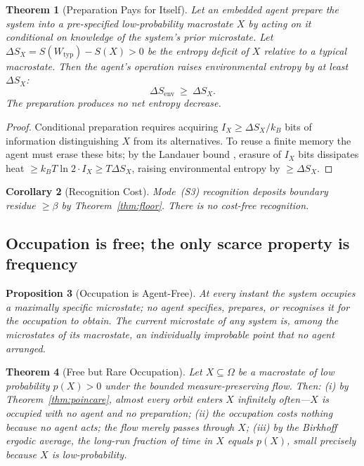 \documentclass[twocolumn,10pt,a4paper]{article}
\theoremstyle{thmstyle}
\newtheorem{theorem}{Theorem}[section]
\newtheorem{proposition}[theorem]{Proposition}
\newtheorem{corollary}[theorem]{Corollary}
\theoremstyle{definition}
\theoremstyle{remark}
\begin{document}
\begin{theorem}[Preparation Pays for Itself]
\label{thm:landauer}
Let an embedded agent prepare the system into a pre-specified
low-probability macrostate $X$ by acting on it conditional on
knowledge of the system's prior microstate. Let
$\Delta S_{X}=S(W_{\mathrm{typ}})-S(X)>0$ be the entropy deficit of
$X$ relative to a typical macrostate. Then the agent's operation
raises environmental entropy by at least $\Delta S_{X}$:
\[
\Delta S_{\mathrm{env}}\ \geq\ \Delta S_{X}.
\]
The preparation produces no net entropy decrease.
\end{theorem}

\begin{proof}
Conditional preparation requires acquiring $I_{X}\geq\Delta S_{X}/k_{B}$
bits of information distinguishing $X$ from its alternatives. To
reuse a finite memory the agent must erase these bits; by the
Landauer bound \citep{landauer1961,bennett1982}, erasure of $I_{X}$
bits dissipates heat $\geq k_{B}T\ln 2\cdot I_{X}\geq T\Delta S_{X}$,
raising environmental entropy by $\geq\Delta S_{X}$.
\end{proof}

\begin{corollary}[Recognition Cost]
\label{cor:recogcost}
Mode~(S3) recognition deposits boundary residue $\geq\beta$ by
Theorem~\ref{thm:floor}. There is no cost-free recognition.
\end{corollary}

\subsection{Occupation is free; the only scarce property is frequency}

\begin{proposition}[Occupation is Agent-Free]
\label{prop:occfree}
At every instant the system occupies a maximally specific microstate;
no agent specifies, prepares, or recognises it for the occupation to
obtain. The current microstate of any system is, among the microstates
of its macrostate, an individually improbable point that no agent
arranged.
\end{proposition}

\begin{theorem}[Free but Rare Occupation]
\label{thm:rare}
Let $X\subseteq\Omega$ be a macrostate of low probability $p(X)>0$
under the bounded measure-preserving flow. Then:
(i) by Theorem~\ref{thm:poincare}, almost every orbit enters $X$
infinitely often---$X$ is occupied with no agent and no preparation;
(ii) the occupation costs nothing because no agent acts; the flow
merely passes through $X$;
(iii) by the Birkhoff ergodic average, the long-run fraction of time
in $X$ equals $p(X)$, small precisely because $X$ is
low-probability.
\end{theorem}
\end{document}
